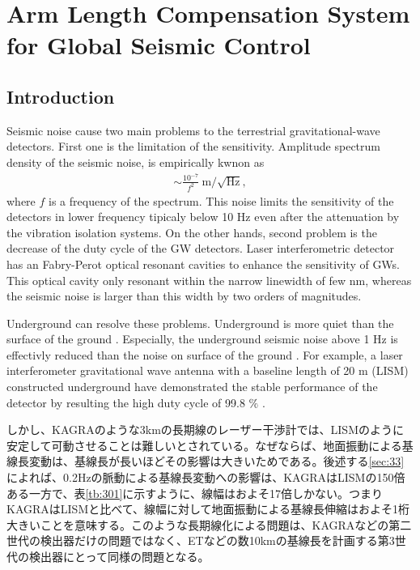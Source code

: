 \chapter{Arm Length Compensation System for Global Seismic Control}
\section{Introduction}
Seismic noise cause two main problems to the terrestrial gravitational-wave detectors. First one is the limitation of the sensitivity. Amplitude spectrum density of the seismic noise, is empirically kwnon as
\begin{eqnarray}
  \sim \frac{10^{-7}}{f^2}\ \mathrm{m}/\sqrt{\mathrm{Hz}},
\end{eqnarray}
where $f$ is a frequency of the spectrum. This noise limits the sensitivity of the detectors in lower frequency tipicaly below 10 $\mathrm{Hz}$ even after the attenuation by the vibration isolation systems. On the other hands, second problem is the decrease of the duty cycle of the GW detectors. Laser interferometric detector has an Fabry-Perot optical resonant cavities to enhance the sensitivity of GWs. This optical cavity only resonant within the narrow linewidth of few $\mathrm{nm}$, whereas the seismic noise is larger than this width by two orders of magnitudes. 

Underground can resolve these problems. Underground is more quiet than the surface of the ground \cite{carter1991high}. Especially, the underground seismic noise above 1 $\mathrm{Hz}$ is effectivly reduced than the noise on surface of the ground \cite{lcgt2009lcgt}. For example, a laser interferometer gravitational wave antenna with a baseline length of 20 $\mathrm{m}$ (LISM) constructed underground have demonstrated the stable performance of the detector by resulting the high duty cycle of 99.8 $\%$ \cite{sato2004ultrastable}. 

しかし、KAGRAのような3kmの長期線のレーザー干渉計では、LISMのように安定して可動させることは難しいとされている。なぜならば、地面振動による基線長変動は、基線長が長いほどその影響は大きいためである。後述する\cref{sec:33}によれば、0.2Hzの脈動による基線長変動への影響は、KAGRAはLISMの150倍ある一方で、表\ref{tb:301}に示すように、線幅はおよそ17倍しかない。つまりKAGRAはLISMと比べて、線幅に対して地面振動による基線長伸縮はおよそ1桁大きいことを意味する。このような長期線化による問題は、KAGRAなどの第二世代の検出器だけの問題ではなく、ETなどの数10kmの基線長を計画する第3世代の検出器にとって同様の問題となる。

